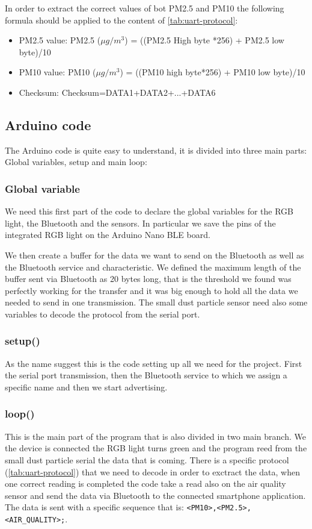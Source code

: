 \documentclass[12pt]{article}
\begin{document}
  In order to extract the correct values of bot PM2.5 and PM10 the following formula should be applied to the content of \autoref{tab:uart-protocol}:

  \begin{itemize}
    \item PM2.5 value: PM2.5 ($\mu g/m^3$)  =  ((PM2.5  High  byte  *256)  +  PM2.5 low byte)/10
    \item PM10 value: PM10 ($\mu g/m^3$)  =  ((PM10  high  byte*256)  +  PM10  low byte)/10
    \item Checksum: Checksum=DATA1+DATA2+...+DATA6
  \end{itemize}

  \subsection{Arduino code}
  The Arduino code is quite easy to understand, it is divided into three main parts: Global variables, setup and main loop:

  \subsubsection{Global variable}
  We need this first part of the code to declare the global variables for the RGB light, the Bluetooth and the sensors. In particular we save the pins of the integrated RGB light on the Arduino Nano BLE board.

  We then create a buffer for the data we want to send on the Bluetooth as well as the Bluetooth service and characteristic. We defined the maximum length of the buffer sent via Bluetooth as 20 bytes long, that is the threshold we found was perfectly working for the transfer and it was big enough to hold all the data we needed to send in one transmission.
  The small dust particle sensor need also some variables to decode the protocol from the serial port.

  \subsubsection{setup()}
  As the name suggest this is the code setting up all we need for the project. First the serial port transmission, then the Bluetooth service to which we assign a specific name and then we start advertising.

  \subsubsection{loop()}
  This is the main part of the program that is also divided in two main branch. We the device is connected the RGB light turns green and the program reed from the small dust particle serial the data that is coming. There is a specific protocol (\autoref{tab:uart-protocol}) that we need to decode in order to exctract the data, when one correct reading is completed the code take a read also on the air quality sensor and send the data via Bluetooth to the connected smartphone application. The data is sent with a specific sequence that is: \verb|<PM10>,<PM2.5>,<AIR_QUALITY>;|.
\end{document}
